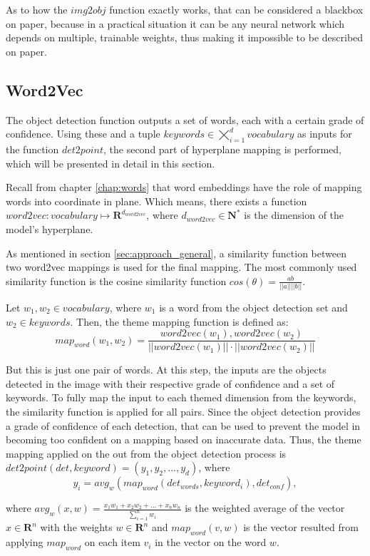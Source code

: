 As to how the $img2obj$ function exactly works, that can be considered a blackbox on paper, because in a practical situation it can be any neural network which depends on multiple, trainable weights, thus making it impossible to be described on paper.

\subsection{Word2Vec}
\label{subsec:approach_formal_word2vec}

The object detection function outputs a set of words, each with a certain grade of confidence. Using these and a tuple $keywords \in \bigtimes_{i=1}^{d}{vocabulary}$ as inputs for the function $det2point$, the second part of hyperplane mapping is performed, which will be presented in detail in this section.

Recall from chapter \ref{chap:words} that word embeddings have the role of mapping words into coordinate in plane. Which means, there exists a function $word2vec : vocabulary \mapsto \mathbf{R}^{d_{word2vec}} $, where $d_{word2vec} \in \mathbf{N^{*}}$ is the dimension of the model's hyperplane.

As mentioned in section \ref{sec:approach_general}, a similarity function between two word2vec mappings is used for the final mapping. The most commonly used similarity function is the cosine similarity function $cos(\theta) = \frac{a b}{|| a || || b ||} $. 

Let $w_1, w_2 \in vocabulary$, where $w_1$ is a word from the object detection set and $w_2 \in keywords$. Then, the theme mapping function is defined as:
$$ map_{word}(w_1, w_2) =  \frac{word2vec(w_1), word2vec(w_2)}{|| word2vec(w_1) || \cdot || word2vec(w_2) ||} $$

But this is just one pair of words. At this step, the inputs are the objects detected in the image with their respective grade of confidence and a set of keywords. To fully map the input to each themed dimension from the keywords, the similarity function is applied for all pairs. Since the object detection provides a grade of confidence of each detection, that can be used to prevent the model in becoming too confident on a mapping based on inaccurate data. Thus, the theme mapping applied on the out from the object detection process is $ det2point(det, keyword) = (y_1, y_2, ..., y_d) $, where 
$$ y_i = avg_{w}(map_{word} (det_{words}, keyword_i) , det_{conf} ) ,$$

where $avg_{w}(x, w) = \frac{x_1 w_1 + x_2 w_2 + ... + x_n w_n}{\sum_{i=1}^{n}{w_i}}$ is the weighted average of the vector $x \in \mathbf{R}^n$ with the weights $w \in \mathbf{R}^n$ and $map_{word} (v, w)$ is the vector resulted from applying $map_{word}$ on each item $v_i$ in the vector on the word $w$.

